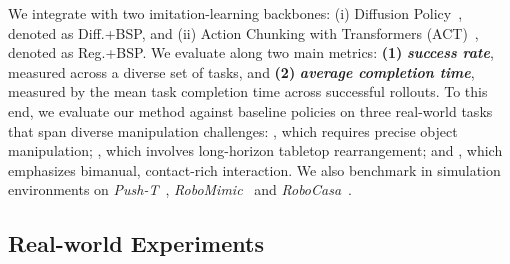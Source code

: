 
We integrate \our with two imitation-learning backbones:
(i) Diffusion Policy~\cite{dp}, denoted as Diff.+BSP, and
(ii) Action Chunking with Transformers (ACT)~\cite{act}, denoted as Reg.+BSP.
We evaluate \our along two main metrics: 
\textbf{(1)} \textit{\textbf{success rate}}, measured across a diverse set of tasks, and 
\textbf{(2)} \textit{\textbf{average completion time}}, measured by the mean task completion time across successful rollouts.
%
To this end, we evaluate our method against baseline policies on three real-world tasks that span diverse manipulation challenges: \pickcube, which requires precise object manipulation; \cleantable, which involves long-horizon tabletop rearrangement; and \stackunstack, which emphasizes bimanual, contact-rich interaction. We also benchmark \our in simulation environments on \textit{Push-T}~\cite{florence2022implicit,dp}, \textit{RoboMimic}~\cite{robomimic2021} and \textit{RoboCasa}~\cite{nasiriany2024robocasa}.




    
\subsection{Real-world Experiments}
\label{sec:real-eval}
\vspace{-5pt}

